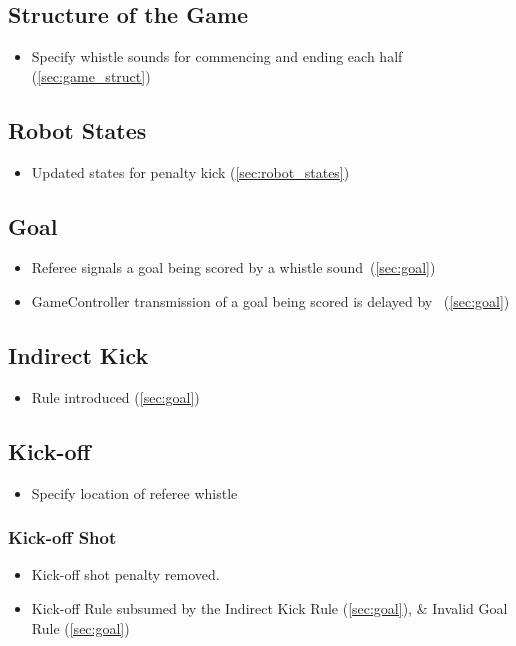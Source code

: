 \subsection*{Structure of the Game}
\begin{itemize}
  \item Specify whistle sounds for commencing and ending each half (\cf \cref{sec:game_struct})
\end{itemize}

\subsection*{Robot States}
\begin{itemize}
  \item Updated states for penalty kick (\cf \cref{sec:robot_states})
\end{itemize}

\subsection*{Goal}
\begin{itemize}
  \item Referee signals a goal being scored by a whistle sound~(\cf \cref{sec:goal})
  \item GameController transmission of a goal being scored is delayed by \GoalScoredDelay~(\cf \cref{sec:goal})
\end{itemize}

\subsection*{Indirect Kick}
\begin{itemize}
  \item Rule introduced (\cf \cref{sec:goal})
\end{itemize}

\subsection*{Kick-off}
\begin{itemize}
  \item Specify location of referee whistle
\end{itemize}

\subsubsection*{Kick-off Shot}
\begin{itemize}
  \item Kick-off shot penalty removed.
  \item Kick-off Rule subsumed by the Indirect Kick Rule (\cf \cref{sec:goal}), \& Invalid Goal Rule (\cf \cref{sec:goal})
\end{itemize}

